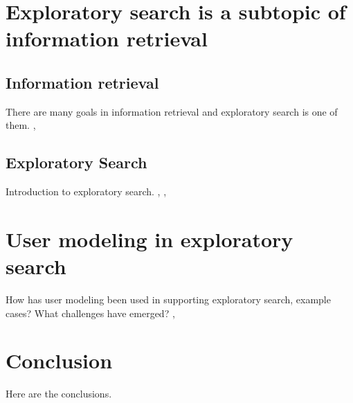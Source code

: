 \documentclass{sigchi}
\begin{document}
\section {Exploratory search is a subtopic of information retrieval}

\subsection{Information retrieval}
There are many goals in information retrieval and exploratory search is one of them.
\cite{hearst02}, \cite{kuhlt91}

\subsection{Exploratory Search}
Introduction to exploratory search.
\cite{march06}, \cite{white09}, \cite{tvaro11}

\section{User modeling in exploratory search}
How has user modeling been used in supporting exploratory search, example cases? What challenges have emerged? 
\cite{oconnor10}, \cite{sugi04}

\section{Conclusion}
Here are the conclusions.

\nocite{*} %



%
%
%
%
%
\balance



\end{document}
